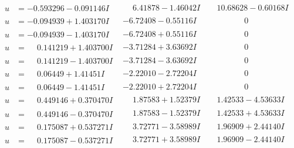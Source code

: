 \documentclass[1p]{elsarticle_modified}
\theoremstyle{definition}
\begin{document}
$$\begin{array}{c|c|c}
\begin{aligned}
u &= -0.593296 - 0.091146 I\end{aligned}
 & \phantom{-}6.41878 - 1.46042 I & \phantom{-}10.68628 - 0.60168 I \\ \hline\begin{aligned}
u &= -0.094939 + 1.403170 I\end{aligned}
 & -6.72408 - 0.55116 I & \phantom{-0.000000 } 0 \\ \hline\begin{aligned}
u &= -0.094939 - 1.403170 I\end{aligned}
 & -6.72408 + 0.55116 I & \phantom{-0.000000 } 0 \\ \hline\begin{aligned}
u &= \phantom{-}0.141219 + 1.403700 I\end{aligned}
 & -3.71284 + 3.63692 I & \phantom{-0.000000 } 0 \\ \hline\begin{aligned}
u &= \phantom{-}0.141219 - 1.403700 I\end{aligned}
 & -3.71284 - 3.63692 I & \phantom{-0.000000 } 0 \\ \hline\begin{aligned}
u &= \phantom{-}0.06449 + 1.41451 I\end{aligned}
 & -2.22010 - 2.72204 I & \phantom{-0.000000 } 0 \\ \hline\begin{aligned}
u &= \phantom{-}0.06449 - 1.41451 I\end{aligned}
 & -2.22010 + 2.72204 I & \phantom{-0.000000 } 0 \\ \hline\begin{aligned}
u &= \phantom{-}0.449146 + 0.370470 I\end{aligned}
 & \phantom{-}1.87583 + 1.52379 I & \phantom{-}1.42533 - 4.53633 I \\ \hline\begin{aligned}
u &= \phantom{-}0.449146 - 0.370470 I\end{aligned}
 & \phantom{-}1.87583 - 1.52379 I & \phantom{-}1.42533 + 4.53633 I \\ \hline\begin{aligned}
u &= \phantom{-}0.175087 + 0.537271 I\end{aligned}
 & \phantom{-}3.72771 - 3.58989 I & \phantom{-}1.96909 + 2.44140 I \\ \hline\begin{aligned}
u &= \phantom{-}0.175087 - 0.537271 I\end{aligned}
 & \phantom{-}3.72771 + 3.58989 I & \phantom{-}1.96909 - 2.44140 I \\ \hline\begin{aligned}

\end{aligned}
\end{array}$$
\end{document}
